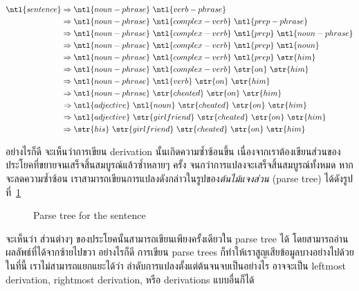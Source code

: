 \begin{align*}
\ntl{sentence}
 &\Rightarrow \ntl{noun-phrase}\ \ntl{verb-phrase} \\
 &\Rightarrow \ntl{noun-phrase}\ \ntl{complex-verb}\ \ntl{prep-phrase} \\
 &\Rightarrow \ntl{noun-phrase}\ \ntl{complex-verb}\ \ntl{prep}\ \ntl{noun-phrase} \\
 &\Rightarrow \ntl{noun-phrase}\ \ntl{complex-verb}\ \ntl{prep}\ \ntl{noun} \\
 &\Rightarrow \ntl{noun-phrase}\ \ntl{complex-verb}\ \ntl{prep}\ \str{him} \\
 &\Rightarrow \ntl{noun-phrase}\ \ntl{complex-verb}\ \str{on}\ \str{him} \\
 &\Rightarrow \ntl{noun-phrase}\ \ntl{verb}\ \str{on}\ \str{him} \\
 &\Rightarrow \ntl{noun-phrase}\ \str{cheated}\ \str{on}\ \str{him} \\
 &\Rightarrow \ntl{adjective}\ \ntl{noun}\ \str{cheated}\ \str{on}\ \str{him} \\
 &\Rightarrow \ntl{adjective}\ \str{girlfriend}\ \str{cheated}\ \str{on}\ \str{him} \\
 &\Rightarrow \str{his}\ \str{girlfriend}\ \str{cheated}\ \str{on}\ \str{him}
\end{align*}

อย่างไรก็ดี จะเห็นว่าการเขียน derivation นั้นเกิดความซ้ำซ้อนขึ้น เนื่องจากเราต้องเขียนส่วนของประโยคที่ขยายจนเสร็จสิ้นสมบูรณ์แล้วซ้ำหลายๆ ครั้ง จนกว่าการแปลงจะเสร็จสิ้นสมบูรณ์ทั้งหมด \enskip หากจะลดความซ้ำซ้อน เราสามารถเขียนการแปลงดังกล่าวในรูปของ\emph{ต้นไม้แจงส่วน} (parse tree) ได้ดังรูปที่~\ref{fig:parse-tree}
%
\begin{figure}
\begin{center}
\end{center}
\caption{Parse tree for the sentence }
\label{fig:parse-tree}
\end{figure}
%
จะเห็นว่า ส่วนต่างๆ ของประโยคนั้นสามารถเขียนเพียงครั้งเดียวใน parse tree ได้ โดยสามารถอ่านผลลัพธ์ที่ได้จากซ้ายไปขวา \enskip อย่างไรก็ดี การเขียน parse trees ก็ทำให้เราสูญเสียข้อมูลบางอย่างไปด้วย \enskip ในที่นี้ เราไม่สามารถแยกแยะได้ว่า ลำดับการแปลงตั้งแต่ต้นจนจบเป็นอย่างไร อาจจะเป็น leftmost derivation, rightmost derivation, หรือ derivations แบบอื่นก็ได้

